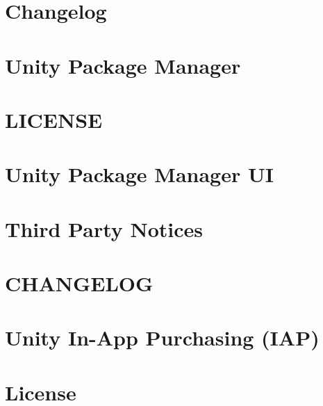 \let\mypdfximage\pdfximage\def\pdfximage{\immediate\mypdfximage}\documentclass[twoside]{book}
\newcommand{\+}{\discretionary{\mbox{\scriptsize$\hookleftarrow$}}{}{}}
\begin{document}
\chapter{Changelog}
\label{autotoc_md99}

\chapter{Unity Package Manager}
\label{autotoc_md124}

\chapter{L\+I\+C\+E\+N\+SE}
\label{md_Library_PackageCache_com_8unity_8package-manager-ui_0d2_80_83_LICENSE}

\chapter{Unity Package Manager UI}
\label{autotoc_md150}

\chapter{Third Party Notices}
\label{md_Library_PackageCache_com_8unity_8package-manager-ui_0d2_80_83_Third_Party_Notices}

\chapter{C\+H\+A\+N\+G\+E\+L\+OG}
\label{md_Library_PackageCache_com_8unity_8purchasing_0d2_80_83_CHANGELOG}

\chapter{Unity In-\/\+App Purchasing (I\+AP)}
\label{autotoc_md151}

\chapter{License}
\label{md_Library_PackageCache_com_8unity_8purchasing_0d2_80_83_License}

\end{document}
